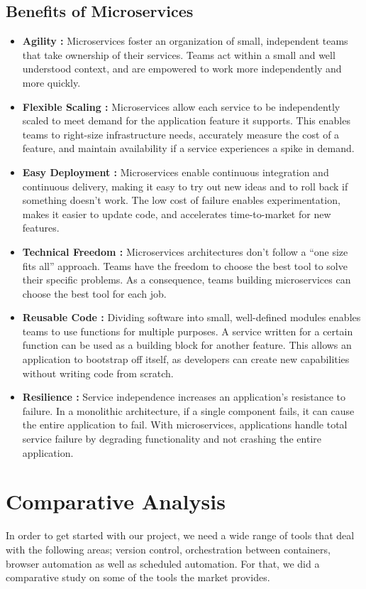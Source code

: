 \subsection{Benefits of Microservices}
\begin{itemize}
    \item \textbf{Agility :} Microservices foster an organization of small, independent teams that take ownership of their services. Teams act within a small and well understood context, and are empowered to work more independently and more quickly.
    \item \textbf{Flexible Scaling :} Microservices allow each service to be independently scaled to meet demand for the application feature it supports. This enables teams to right-size infrastructure needs, accurately measure the cost of a feature, and maintain availability if a service experiences a spike in demand.
    \item \textbf{Easy Deployment :} Microservices enable continuous integration and continuous delivery, making it easy to try out new ideas and to roll back if something doesn’t work. The low cost of failure enables experimentation, makes it easier to update code, and accelerates time-to-market for new features.
    \item \textbf{Technical Freedom :} Microservices architectures don’t follow a “one size fits all” approach. Teams have the freedom to choose the best tool to solve their specific problems. As a consequence, teams building microservices can choose the best tool for each job.
    \item \textbf{Reusable Code :} Dividing software into small, well-defined modules enables teams to use functions for multiple purposes. A service written for a certain function can be used as a building block for another feature. This allows an application to bootstrap off itself, as developers can create new capabilities without writing code from scratch.
    \item \textbf{Resilience :} Service independence increases an application’s resistance to failure. In a monolithic architecture, if a single component fails, it can cause the entire application to fail. With microservices, applications handle total service failure by degrading functionality and not crashing the entire application.
\end{itemize}

\section{Comparative Analysis}
In order to get started with our project, we need a wide range of tools that deal with the following areas; version control, orchestration between containers, browser automation as well as scheduled automation. For that, we did a comparative study on some of the tools the market provides.

